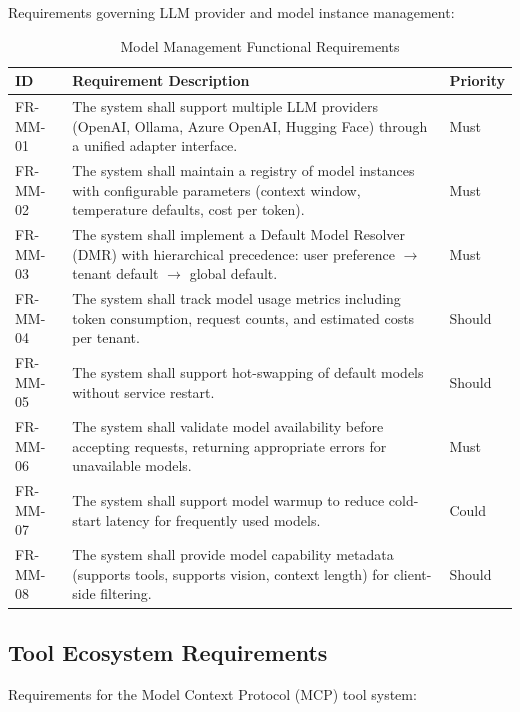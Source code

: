 \documentclass[a4paper,twoside]{sapthesis}
\begin{document}
Requirements governing LLM provider and model instance management:

\begin{table}[htbp]
\centering
\caption{Model Management Functional Requirements}
\label{tab:fr-model-management}
\small
\begin{tabularx}{\textwidth}{|l|X|l|}
\hline
\textbf{ID} & \textbf{Requirement Description} & \textbf{Priority} \\
\midrule
FR-MM-01 & The system shall support multiple LLM providers (OpenAI, Ollama, Azure OpenAI, Hugging Face) through a unified adapter interface. & Must \\
\midrule
FR-MM-02 & The system shall maintain a registry of model instances with configurable parameters (context window, temperature defaults, cost per token). & Must \\
\midrule
FR-MM-03 & The system shall implement a Default Model Resolver (DMR) with hierarchical precedence: user preference $\rightarrow$ tenant default $\rightarrow$ global default. & Must \\
\midrule
FR-MM-04 & The system shall track model usage metrics including token consumption, request counts, and estimated costs per tenant. & Should \\
\midrule
FR-MM-05 & The system shall support hot-swapping of default models without service restart. & Should \\
\midrule
FR-MM-06 & The system shall validate model availability before accepting requests, returning appropriate errors for unavailable models. & Must \\
\midrule
FR-MM-07 & The system shall support model warmup to reduce cold-start latency for frequently used models. & Could \\
\midrule
FR-MM-08 & The system shall provide model capability metadata (supports tools, supports vision, context length) for client-side filtering. & Should \\
\midrule
\end{tabularx}
\end{table}

\subsection{Tool Ecosystem Requirements}
\label{subsec:fr-tools}

Requirements for the Model Context Protocol (MCP) tool system:
\end{document}
